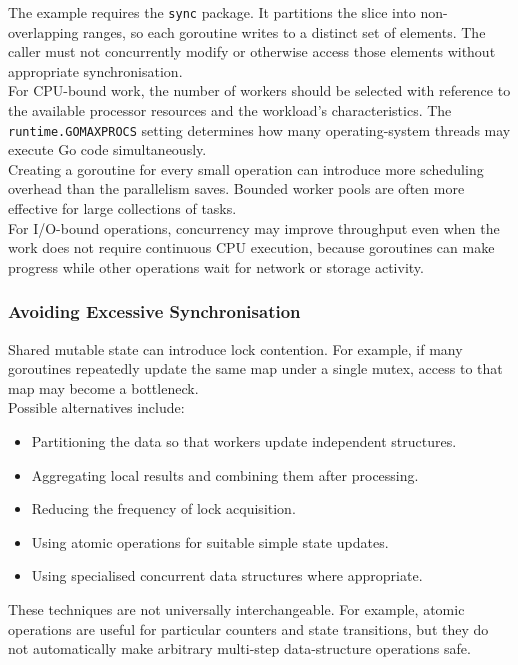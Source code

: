The example requires the \texttt{sync} package. It partitions the slice into non-overlapping ranges, so each goroutine writes to a distinct set of elements. The caller must not concurrently modify or otherwise access those elements without appropriate synchronisation.\\

For CPU-bound work, the number of workers should be selected with reference to the available processor resources and the workload's characteristics. The \texttt{runtime.GOMAXPROCS} setting determines how many operating-system threads may execute Go code simultaneously.\\

Creating a goroutine for every small operation can introduce more scheduling overhead than the parallelism saves. Bounded worker pools are often more effective for large collections of tasks.\\

For I/O-bound operations, concurrency may improve throughput even when the work does not require continuous CPU execution, because goroutines can make progress while other operations wait for network or storage activity.\\

\subsubsection{Avoiding Excessive Synchronisation}

Shared mutable state can introduce lock contention. For example, if many goroutines repeatedly update the same map under a single mutex, access to that map may become a bottleneck.\\

Possible alternatives include:

\begin{itemize}
    \item Partitioning the data so that workers update independent structures.
    \item Aggregating local results and combining them after processing.
    \item Reducing the frequency of lock acquisition.
    \item Using atomic operations for suitable simple state updates.
    \item Using specialised concurrent data structures where appropriate.
\end{itemize}

These techniques are not universally interchangeable. For example, atomic operations are useful for particular counters and state transitions, but they do not automatically make arbitrary multi-step data-structure operations safe.\\

